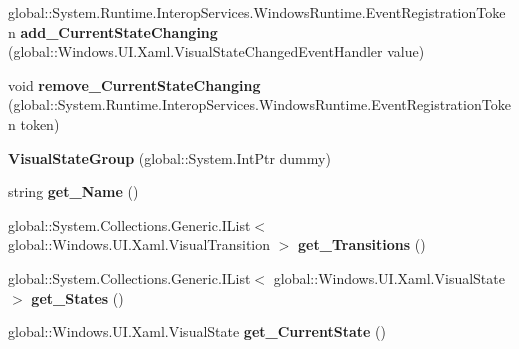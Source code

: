 \begin{DoxyCompactItemize}
\mbox{\label{class_windows_1_1_u_i_1_1_xaml_1_1_visual_state_group_a5fad6e8105f727dac7ab1a1b62568c0a}} 
global\+::\+System.\+Runtime.\+Interop\+Services.\+Windows\+Runtime.\+Event\+Registration\+Token {\bfseries add\+\_\+\+Current\+State\+Changing} (global\+::\+Windows.\+U\+I.\+Xaml.\+Visual\+State\+Changed\+Event\+Handler value)
\item 
\mbox{\label{class_windows_1_1_u_i_1_1_xaml_1_1_visual_state_group_aa287d3d7b305f3adad8090ce145b7729}} 
void {\bfseries remove\+\_\+\+Current\+State\+Changing} (global\+::\+System.\+Runtime.\+Interop\+Services.\+Windows\+Runtime.\+Event\+Registration\+Token token)
\item 
\mbox{\label{class_windows_1_1_u_i_1_1_xaml_1_1_visual_state_group_a8f7185159b1235d9b31261ec34a8498c}} 
{\bfseries Visual\+State\+Group} (global\+::\+System.\+Int\+Ptr dummy)
\item 
\mbox{\label{class_windows_1_1_u_i_1_1_xaml_1_1_visual_state_group_a2813cd015a01c964c6588672b185ac26}} 
string {\bfseries get\+\_\+\+Name} ()
\item 
\mbox{\label{class_windows_1_1_u_i_1_1_xaml_1_1_visual_state_group_a3738f82b20d960a14fdcfb568b232d49}} 
global\+::\+System.\+Collections.\+Generic.\+I\+List$<$ global\+::\+Windows.\+U\+I.\+Xaml.\+Visual\+Transition $>$ {\bfseries get\+\_\+\+Transitions} ()
\item 
\mbox{\label{class_windows_1_1_u_i_1_1_xaml_1_1_visual_state_group_a5f5c4abd2e95e2f7522780c26a7db8fd}} 
global\+::\+System.\+Collections.\+Generic.\+I\+List$<$ global\+::\+Windows.\+U\+I.\+Xaml.\+Visual\+State $>$ {\bfseries get\+\_\+\+States} ()
\item 
\mbox{\label{class_windows_1_1_u_i_1_1_xaml_1_1_visual_state_group_a74be4bea547bdf72e792a3c489cb7878}} 
global\+::\+Windows.\+U\+I.\+Xaml.\+Visual\+State {\bfseries get\+\_\+\+Current\+State} ()

\end{DoxyCompactItemize}
